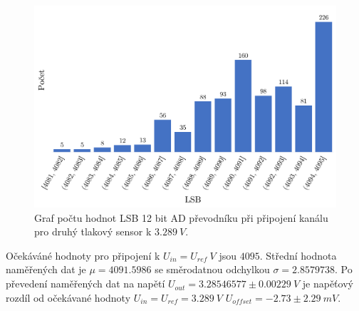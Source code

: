 \begin{figure}[H]
    \caption{Graf počtu hodnot LSB 12 bit AD převodníku při připojení kanálu pro druhý tlakový sensor k $3.289 \ V$.}
    \label{fig:hist_vacuum2_3_3}
    \includegraphics[width=1\textwidth]{graphs/vacuum2_33.png}


\end{figure}
Očekáváné hodnoty pro připojení k $U_{in} = U_{ref} \ V$ jsou $4095$. Střední hodnota naměřených dat je $\mu = 4091.5986$ se směrodatnou odchylkou $\sigma = 2.8579738$. Po převedení naměřených dat na napětí $U_{out} = 3.28546577 \pm 0.00229 \ V$ je napěťový rozdíl od očekávané hodnoty $U_{in} = U_{ref} = 3.289 \ V$
$U_{offset} = -2.73 \pm 2.29 \ mV$.